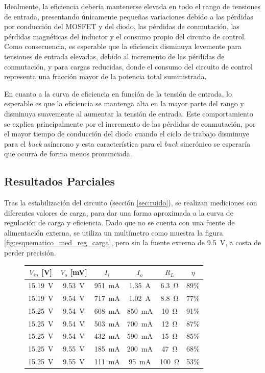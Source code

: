 \documentclass[]{article}
\begin{document}
Idealmente, la eficiencia debería mantenerse elevada en todo el rango de tensiones de entrada, presentando únicamente pequeñas variaciones debido a las pérdidas por conducción del MOSFET y del diodo, las pérdidas de conmutación, las pérdidas magnéticas del inductor y el consumo propio del circuito de control. Como consecuencia, es esperable que la eficiencia disminuya levemente para tensiones de entrada elevadas, debido al incremento de las pérdidas de conmutación, y para cargas reducidas, donde el consumo del circuito de control representa una fracción mayor de la potencia total suministrada.

En cuanto a la curva de eficiencia en función de la tensión de entrada, lo esperable es que la eficiencia se mantenga alta en la mayor parte del rango y disminuya suavemente al aumentar la tensión de entrada. Este comportamiento se explica principalmente por el incremento de las pérdidas de conmutación, por el mayor tiempo de conducción del diodo cuando el ciclo de trabajo disminuye para el \textit{buck} asíncrono y esta característica para el \textit{buck} sincrónico se esperaría que ocurra de forma menos pronunciada. 
	
		\subsection{Resultados Parciales}
	Tras la estabilización del circuito (sección \ref{sec:ruido}), se realizan mediciones con diferentes valores de carga, para dar una forma aproximada a la curva de regulación de carga y eficiencia. Dado que no se cuenta con una fuente de alimentación externa, se utiliza un multímetro como muestra la figura \ref{fig:esquematico_med_reg_carga}, pero sin la fuente externa de \SI{9.5}{V}, a costa de perder precisión.
	
	\begin{figure}[H]
		\centering
		\label{tab:regulacion_carga}
		\begin{tabular}{cccccc}
			\toprule
			$V_{in}$ [V] & $ V_o$ [mV] & $I_i$ & $I_o$ & $R_L$ & $\eta$ \\
			\midrule
			\SI{15.19}{V} & \SI{9.53}{V} & \SI{951}{mA} & \SI{1.35}{A} & \SI{6.3}{\ohm} & 89\% \\
			\SI{15.19}{V} & \SI{9.54}{V} & \SI{717}{mA} & \SI{1.02}{A} & \SI{8.8}{\ohm} & 77\% \\
			\SI{15.25}{V} & \SI{9.54}{V} & \SI{608}{mA} & \SI{850}{mA} & \SI{10}{\ohm} & 91\% \\
			\SI{15.25}{V} & \SI{9.54}{V} & \SI{503}{mA} & \SI{700}{mA} & \SI{12}{\ohm} & 87\% \\
			\SI{15.25}{V} & \SI{9.54}{V} & \SI{432}{mA} & \SI{590}{mA} & \SI{15}{\ohm} & 85\% \\
			\SI{15.25}{V} & \SI{9.55}{V} & \SI{185}{mA} & \SI{200}{mA} & \SI{47}{\ohm} & 68\% \\
			\SI{15.25}{V} & \SI{9.55}{V} & \SI{111}{mA} & \SI{95}{mA} & \SI{100}{\ohm} & 53\% \\
			\bottomrule
		\end{tabular}
	\end{figure}
	
\end{document}
